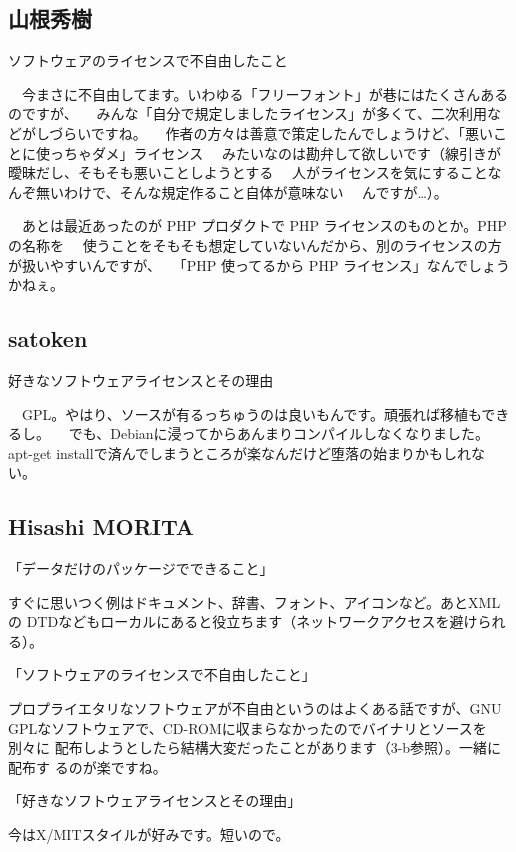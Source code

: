 \documentclass[mingoth,a4paper]{jsarticle}
\begin{document}
\begin{multicols}{2}
{\subsection{山根秀樹}

ソフトウェアのライセンスで不自由したこと

　今まさに不自由してます。いわゆる「フリーフォント」が巷にはたくさんあるのですが、
　みんな「自分で規定しましたライセンス」が多くて、二次利用などがしづらいですね。
　作者の方々は善意で策定したんでしょうけど、「悪いことに使っちゃダメ」ライセンス
　みたいなのは勘弁して欲しいです（線引きが曖昧だし、そもそも悪いことしようとする
　人がライセンスを気にすることなんぞ無いわけで、そんな規定作ること自体が意味ない
　んですが…）。

　あとは最近あったのが PHP プロダクトで PHP ライセンスのものとか。PHP の名称を
　使うことをそもそも想定していないんだから、別のライセンスの方が扱いやすいんですが、
　「PHP 使ってるから PHP ライセンス」なんでしょうかねぇ。


\subsection{satoken}

好きなソフトウェアライセンスとその理由

　GPL。やはり、ソースが有るっちゅうのは良いもんです。頑張れば移植もできるし。
　でも、Debianに浸ってからあんまりコンパイルしなくなりました。apt-get installで済んでしまうところが楽なんだけど堕落の始まりかもしれない。

\subsection{Hisashi MORITA}

「データだけのパッケージでできること」

すぐに思いつく例はドキュメント、辞書、フォント、アイコンなど。あとXMLの
DTDなどもローカルにあると役立ちます（ネットワークアクセスを避けられる）。

「ソフトウェアのライセンスで不自由したこと」

プロプライエタリなソフトウェアが不自由というのはよくある話ですが、GNU
GPLなソフトウェアで、CD-ROMに収まらなかったのでバイナリとソースを別々に
配布しようとしたら結構大変だったことがあります（3-b参照）。一緒に配布す
るのが楽ですね。

「好きなソフトウェアライセンスとその理由」

今はX/MITスタイルが好みです。短いので。

}
\end{multicols}
\end{document}
